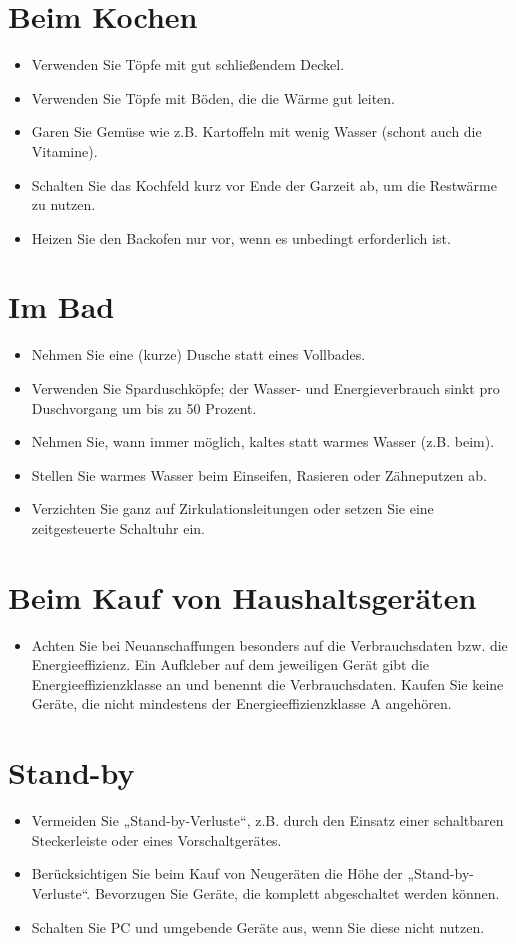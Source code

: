 \documentclass{scrartcl}
\begin{document}
\section*{Beim Kochen}
\begin{itemize}
\item Verwenden Sie Töpfe mit gut schließendem Deckel.
\item Verwenden Sie Töpfe mit Böden, die die Wärme gut leiten.
\item Garen Sie Gemüse wie z.B. Kartoffeln mit wenig Wasser (schont auch die Vitamine).
\item Schalten Sie das Kochfeld kurz vor Ende der Garzeit ab, um die Restwärme zu nutzen.
\item Heizen Sie den Backofen nur vor, wenn es unbedingt erforderlich ist.
\end{itemize}

\section*{Im Bad}
\begin{itemize}
\item Nehmen Sie eine (kurze) Dusche statt eines Vollbades.
\item Verwenden Sie Sparduschköpfe; der Wasser- und Energieverbrauch sinkt pro Duschvorgang um bis zu 50 Prozent.
\item Nehmen Sie, wann immer möglich, kaltes statt warmes Wasser (z.B. beim).
\item Stellen Sie warmes Wasser beim Einseifen, Rasieren oder Zähneputzen ab.
\item Verzichten Sie ganz auf Zirkulationsleitungen oder setzen Sie eine zeitgesteuerte Schaltuhr ein.
\end{itemize}

\section*{Beim Kauf von Haushaltsgeräten}
\begin{itemize}
\item Achten Sie bei Neuanschaffungen besonders auf die Verbrauchsdaten bzw. die Energieeffizienz. Ein Aufkleber auf dem jeweiligen Gerät gibt die Energieeffizienzklasse an und benennt die Verbrauchsdaten. Kaufen Sie keine Geräte, die nicht mindestens der Energieeffizienzklasse A angehören.
\end{itemize}

\section*{Stand-by}
\begin{itemize}
\item Vermeiden Sie „Stand-by-Verluste“, z.B. durch den Einsatz einer schaltbaren Steckerleiste oder eines Vorschaltgerätes.
\item Berücksichtigen Sie beim Kauf von Neugeräten die Höhe der „Stand-by-Verluste“. Bevorzugen Sie Geräte, die komplett abgeschaltet werden können.
\item Schalten Sie PC und umgebende Geräte aus, wenn Sie diese nicht nutzen.
\end{itemize}

\printindex

\end{document}
